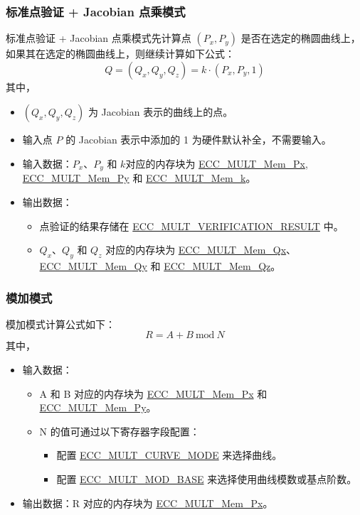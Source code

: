 \documentclass[main\_\_CN.tex]{subfiles}
\begin{document}
\subsubsection{标准点验证 + Jacobian 点乘模式}

标准点验证 + Jacobian 点乘模式先计算点 $(P_x,P_y)$ 是否在选定的椭圆曲线上，如果其在选定的椭圆曲线上，则继续计算如下公式：
\[
Q = (Q_x,Q_y,Q_z) = k \cdot (P_x,P_y,1)
\]
其中，
\begin{itemize}
    \item $(Q_x,Q_y,Q_z)$ 为 Jacobian 表示的曲线上的点。
    \item 输入点 $P$ 的 Jacobian 表示中添加的 1 为硬件默认补全，不需要输入。
    \item 输入数据：$P_x$、$P_y$ 和 $k$对应的内存块为 \hyperref[tab:ecc-memory]{ECC\_MULT\_Mem\_Px}, \hyperref[tab:ecc-memory]{ECC\_MULT\_Mem\_Py} 和 \hyperref[tab:ecc-memory]{ECC\_MULT\_Mem\_k}。
    \item 输出数据：
    \begin{itemize}
        \item 点验证的结果存储在 \hyperref[fielddesc:ECCMULTVERIFICATIONRESULT]{ECC\_MULT\_VERIFICATION\_RESULT} 中。
        \item $Q_x$、$Q_y$ 和 $Q_z$ 对应的内存块为 \hyperref[tab:ecc-memory]{ECC\_MULT\_Mem\_Qx}、\hyperref[tab:ecc-memory]{ECC\_MULT\_Mem\_Qy} 和 \hyperref[tab:ecc-memory]{ECC\_MULT\_Mem\_Qz}。
    \end{itemize}
\end{itemize}

\subsubsection{模加模式}
模加模式计算公式如下：
\[
R = A + B \ \textrm{mod}\ N
\]
其中，
\begin{itemize}
    \item 输入数据：
    \begin{itemize}
        \item A 和 B 对应的内存块为 \hyperref[tab:ecc-memory]{ECC\_MULT\_Mem\_Px} 和 \hyperref[tab:ecc-memory]{ECC\_MULT\_Mem\_Py}。
        \item N 的值可通过以下寄存器字段配置：
        \begin{itemize}
            \item 配置 \hyperref[fielddesc:ECCMULTCURVEMODE]{ECC\_MULT\_CURVE\_MODE} 来选择曲线。
            \item 配置 \hyperref[fielddesc:ECCMULTMODBASE]{ECC\_MULT\_MOD\_BASE} 来选择使用曲线模数或基点阶数。
        \end{itemize}
    \end{itemize}
    \item 输出数据：R 对应的内存块为 \hyperref[tab:ecc-memory]{ECC\_MULT\_Mem\_Px}。
\end{itemize}
\end{document}
